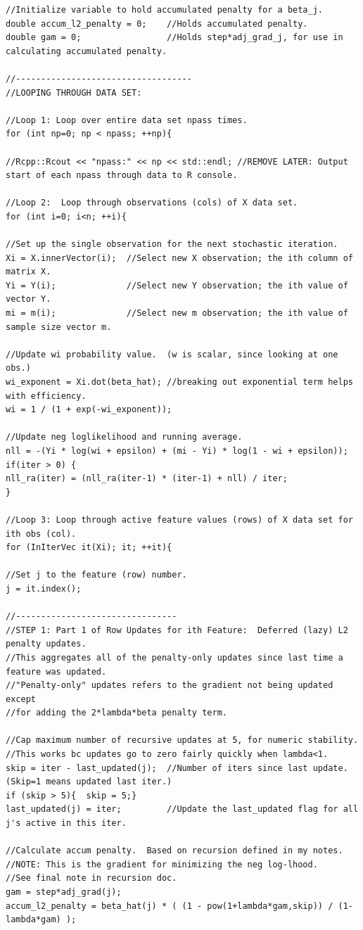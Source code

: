 \documentclass[paper=a4, fontsize=11pt]{scrartcl} %
\numberwithin{equation}{section} %
\numberwithin{figure}{section} %
\numberwithin{table}{section} %
\begin{document}
\begin{lstlisting}
//Initialize variable to hold accumulated penalty for a beta_j.
double accum_l2_penalty = 0;	//Holds accumulated penalty.
double gam = 0;					//Holds step*adj_grad_j, for use in calculating accumulated penalty.

//-----------------------------------
//LOOPING THROUGH DATA SET:

//Loop 1: Loop over entire data set npass times.
for (int np=0; np < npass; ++np){

//Rcpp::Rcout << "npass:" << np << std::endl; //REMOVE LATER: Output start of each npass through data to R console.

//Loop 2:  Loop through observations (cols) of X data set.
for (int i=0; i<n; ++i){

//Set up the single observation for the next stochastic iteration.  
Xi = X.innerVector(i);	//Select new X observation; the ith column of matrix X.
Yi = Y(i);				//Select new Y observation; the ith value of vector Y.
mi = m(i);				//Select new m observation; the ith value of sample size vector m.			

//Update wi probability value.  (w is scalar, since looking at one obs.)
wi_exponent = Xi.dot(beta_hat); //breaking out exponential term helps with efficiency.
wi = 1 / (1 + exp(-wi_exponent));

//Update neg loglikelihood and running average.
nll = -(Yi * log(wi + epsilon) + (mi - Yi) * log(1 - wi + epsilon));
if(iter > 0) {
nll_ra(iter) = (nll_ra(iter-1) * (iter-1) + nll) / iter;
}			

//Loop 3: Loop through active feature values (rows) of X data set for ith obs (col).
for (InIterVec it(Xi); it; ++it){

//Set j to the feature (row) number.
j = it.index();

//--------------------------------
//STEP 1: Part 1 of Row Updates for ith Feature:  Deferred (lazy) L2 penalty updates.
//This aggregates all of the penalty-only updates since last time a feature was updated.
//"Penalty-only" updates refers to the gradient not being updated except
//for adding the 2*lambda*beta penalty term.

//Cap maximum number of recursive updates at 5, for numeric stability.
//This works bc updates go to zero fairly quickly when lambda<1.
skip = iter - last_updated(j);	//Number of iters since last update. (Skip=1 means updated last iter.)
if (skip > 5){  skip = 5;}		
last_updated(j) = iter;			//Update the last_updated flag for all j's active in this iter.

//Calculate accum penalty.  Based on recursion defined in my notes.
//NOTE: This is the gradient for minimizing the neg log-lhood.  
//See final note in recursion doc.
gam = step*adj_grad(j);
accum_l2_penalty = beta_hat(j) * ( (1 - pow(1+lambda*gam,skip)) / (1-lambda*gam) );


\end{lstlisting}
\end{document}
